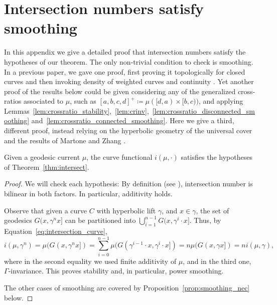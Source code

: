 \section{Intersection numbers satisfy smoothing}
\label{app:necessary}

In this appendix we give a detailed proof that intersection numbers
satisfy the hypotheses of our theorem. The only non-trivial condition
to check is smoothing.
In a previous paper, we gave one proof, first proving it
topologically for closed curves and then invoking density of weighted
curves and continuity \cite[Example~4.2]{MGT21:Smoothings}. Yet another proof of the results below could be given considering any of the generalized cross-ratios associated to $\mu$, such as $[a,b,c,d]^+ \coloneqq \mu([d,a) \times [b,c))$, and applying Lemmas~\ref{lem:crossratio_stability},~\ref{lem:crinv},~\ref{lem:crossratio_disconnected_smoothing} and~\ref{lem:crossratio_connected_smoothing}. Here we
give a third, different proof, instead relying
on the hyperbolic geometry of the universal cover and the results of Martone and Zhang
\cite{MZ19:PositivelyRatioed}.


\begin{proposition}
Given a geodesic current $\mu$, the curve functional $i(\mu, \cdot)$ satisfies the hypotheses of Theorem~\ref{thm:intersect}.
\label{prop:necessary}
\end{proposition}
\begin{proof}
We will check each hypothesis:
 By definition (see \cite{Bonahon86:EndsHyperbolicManifolds}), intersection number is bilinear in both factors. In particular, additivity holds.

 Observe that given a curve $C$ with hyperbolic lift
 $\gamma$, and $x \in \gamma$, the set of geodesics $G(x, \gamma^n x]$
 can be partitioned into $\bigcup_{i=1}^{n-1} G(x, \gamma^{i} \cdot
 x]$.  Thus, by Equation~\eqref{eq:intersection_curve},
\begin{equation}\label{eq:intersection-stability}
i(\mu, \gamma^n) = \mu(G(x, \gamma^n x]) = \sum_{i=0}^{n-1} \mu(G(\gamma^{i-1} \cdot x, \gamma^{i} \cdot x]) = n\mu(G(x, \gamma x]) = n i(\mu, \gamma),
\end{equation}
where in the second equality we used finite additivity of $\mu$, and
in the third one, $\Gamma$-invariance. This proves stability and, in
particular, power smoothing.

 The other cases of smoothing are covered by
 Proposition~\ref{prop:smoothing_nec} below.
\end{proof}


